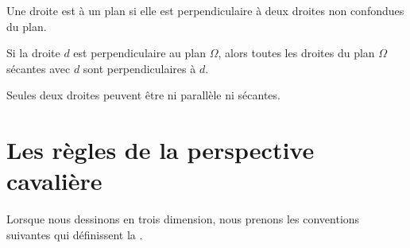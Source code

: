 \begin{definition}
    Une droite est  à un plan si elle est perpendiculaire à deux droites non confondues du plan.
\end{definition}

\begin{Aretenir}
    Si la droite \( d\) est perpendiculaire au plan \( \Omega\), alors toutes les droites du plan \( \Omega\) sécantes avec \( d\) sont perpendiculaires à \( d\).
\end{Aretenir}

\begin{remark}
    Seules deux droites peuvent être ni parallèle ni sécantes.
\end{remark}

\section{Les règles de la perspective cavalière}

Lorsque nous dessinons en trois dimension, nous prenons les conventions suivantes qui définissent la .

